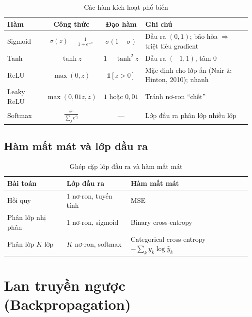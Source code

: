 \begin{table}[H]
\centering
\begin{tabular}{|l|c|c|p{4.8cm}|}
\hline
\textbf{Hàm} & \textbf{Công thức} & \textbf{Đạo hàm} & \textbf{Ghi chú} \\
\hline
Sigmoid & $\sigma(z) = \frac{1}{1 + e^{-z}}$ & $\sigma(1 - \sigma)$ & Đầu ra $(0, 1)$; bão hòa $\Rightarrow$ triệt tiêu gradient \\[4pt] \hline
Tanh & $\tanh z$ & $1 - \tanh^2 z$ & Đầu ra $(-1, 1)$, tâm 0 \\[4pt] \hline
ReLU & $\max(0, z)$ & $\mathbb{1}[z > 0]$ & Mặc định cho lớp ẩn (Nair \& Hinton, 2010); nhanh \\[4pt] \hline
Leaky ReLU & $\max(0{,}01z, z)$ & $1$ hoặc $0{,}01$ & Tránh nơ-ron ``chết'' \\[4pt] \hline
Softmax & $\frac{e^{z_k}}{\sum_j e^{z_j}}$ & --- & Lớp đầu ra phân lớp nhiều lớp \\[4pt] \hline
\end{tabular}
\caption{Các hàm kích hoạt phổ biến}
\end{table}


\subsection{Hàm mất mát và lớp đầu ra}

\begin{table}[H]
\centering
\begin{tabular}{|l|l|l|}
\hline
\textbf{Bài toán} & \textbf{Lớp đầu ra} & \textbf{Hàm mất mát} \\
\hline
Hồi quy & 1 nơ-ron, tuyến tính & MSE \\ \hline
Phân lớp nhị phân & 1 nơ-ron, sigmoid & Binary cross-entropy \\ \hline
Phân lớp $K$ lớp & $K$ nơ-ron, softmax & Categorical cross-entropy $-\sum_k y_k \log \hat{y}_k$ \\ \hline
\end{tabular}
\caption{Ghép cặp lớp đầu ra và hàm mất mát}
\end{table}

\section{Lan truyền ngược (Backpropagation)}
\label{sec:backprop}

